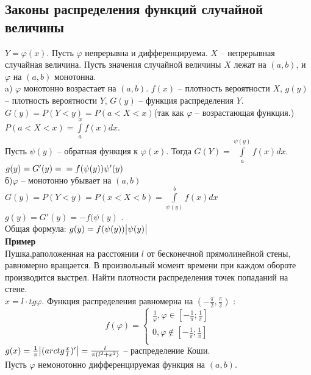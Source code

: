 \documentclass[russian, 12pt, fleqn]{article}
\begin{document}
\subsection{Законы распределения функций случайной величины}
$Y=\varphi(x)$. Пусть $\varphi$ непрерывна и дифференцируема. $X$ -- непрерывная случайная величина. Пусть значения случайной величины $X$ лежат на $(a, b)$, и $\varphi$ на $(a, b)$ монотонна.\\
a) $\varphi$ монотонно возрастает на $(a, b)$. $f(x)$ -- плотность вероятности $X$, $g(y)$ -- плотность вероятности $Y$, $G(y)$ -- функция распределения $Y$. \\$G(y) = P(Y < y) = P(a < X < x) $(так как $\varphi$ -- возрастающая функция.)\\
$P(a<X<x) = \displaystyle{\int \limits_{a}^{x}} f(x) dx$.\\
Пусть $\psi(y)$ -- обратная функция к $\varphi(x)$.
Тогда $G(Y) =   \displaystyle{\int \limits_{a}^{\psi(y)}} f(x) dx$. $g(y) = G'(y) =\\= f(\psi(y))\psi'(y)$\\
б)$\varphi$ -- монотонно убывает на $(a, b)$\\
$G(y) = P(Y < y) = P(x< X < b) =  \displaystyle{\int \limits_{\psi(y)}^{b}} f(x) dx$\\
$g(y) = G'(y) = -f(\psi(y)$ .\\
Общая формула: $g(y) = f(\psi(y)) \abs{\psi(y)}$\\
\textbf{Пример} \\
Пушка,раположенная на  расстоянии $l$ от бесконечной прямолинейной стены, равномерно вращается. В произвольный момент времени при каждом обороте производится выстрел. Найти плотности распределения точек попаданий  на стене.\\
$x = l \cdot tg \varphi$. Функция распределения равномерна на $(-\frac{\pi}{2},\frac{\pi}{2})$ : \\
\begin{equation*} 
f(\varphi)=
 \begin{cases}
   \frac{1}{\varphi},  \varphi \in [-\frac{1}{\pi};\frac{1}{\pi}]\\
   0 , \varphi \notin [-\frac{1}{\pi};\frac{1}{\pi}]\\
 \end{cases}
\end{equation*}
$g(x) = \frac{1}{\pi} \abs{(arctg \frac{x}{l})'} = \frac{l}{\pi(l^2 + x^2)}$ -- распределение Коши.\\
Пусть $\varphi$ немонотонно дифференцируемая функция на $(a, b)$.\\
\end{document}
